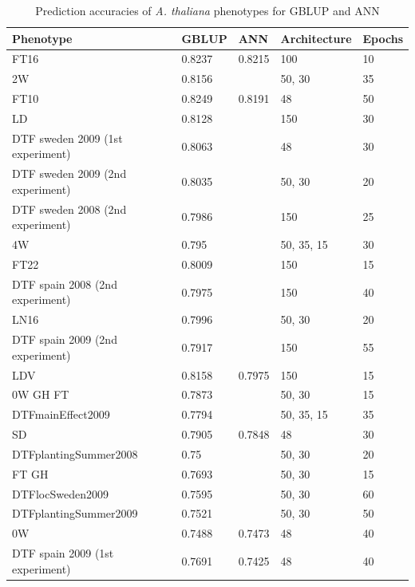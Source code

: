 \singlespacing
\begin{longtable}{p{} p{} p{} p{} p{}}
  \caption[Prediction accuracies of \textit{A. thaliana} phenotypes for GBLUP and ANN]{Prediction accuracies of \textit{A. thaliana} phenotypes for GBLUP and ANN} \\
 \toprule
 Phenotype & GBLUP & ANN & Architecture & Epochs \\
 \hline
 FT16 & 0.8237 & 0.8215 & 100 & 10 \\
 2W & 0.8156 & \color{red}{0.8205} & 50, 30 & 35 \\
 FT10 & 0.8249 & 0.8191 & 48 & 50 \\
 LD & 0.8128 & \color{red}{0.8159} & 150 & 30 \\
 DTF sweden 2009 (1st experiment) & 0.8063 & \color{red}{0.8141} & 48 & 30 \\
 DTF sweden 2009 (2nd experiment) & 0.8035 & \color{red}{0.8091} & 50, 30 & 20 \\
 DTF sweden 2008 (2nd experiment) & 0.7986 & \color{red}{0.8057} & 150 & 25 \\
 4W & 0.795 & \color{red}{0.8052} & 50, 35, 15 & 30 \\
 FT22 & 0.8009 & \color{red}{0.8043} & 150 & 15 \\
 DTF spain 2008 (2nd experiment) & 0.7975 & \color{red}{0.8032} & 150 & 40 \\
 LN16 & 0.7996 & \color{red}{0.7999} & 50, 30 & 20 \\
 DTF spain 2009 (2nd experiment) & 0.7917 & \color{red}{0.7988} & 150 & 55 \\
 LDV & 0.8158 & 0.7975 & 150 & 15 \\
 0W GH FT & 0.7873 & \color{red}{0.7942} & 50, 30 & 15 \\
 DTFmainEffect2009 & 0.7794 & \color{red}{0.7855} & 50, 35, 15 & 35 \\
 SD & 0.7905 & 0.7848 & 48 & 30 \\
 DTFplantingSummer2008 & 0.75 & \color{red}{0.7746} & 50, 30 & 20 \\
 FT GH & 0.7693 & \color{red}{0.7702} & 50, 30 & 15 \\
 DTFlocSweden2009 & 0.7595 & \color{red}{0.7626} & 50, 30 & 60 \\
 DTFplantingSummer2009 & 0.7521 & \color{red}{0.7584} & 50, 30 & 50 \\
 0W & 0.7488 & 0.7473 & 48 & 40 \\
 DTF spain 2009 (1st experiment) & 0.7691 & 0.7425 & 48 & 40 \\

\end{longtable}
